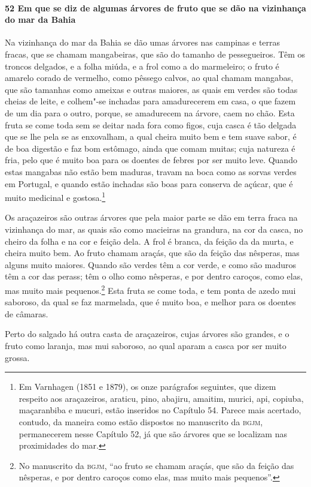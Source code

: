\begin{linenumbers}
\paragraph{52 Em que se diz de algumas árvores de fruto que se dão na vizinhança do mar da
Bahia}\quad
Na vizinhança do mar da Bahia se dão umas árvores nas campinas e terras fracas, que se
chamam mangabeiras, que são do tamanho de pessegueiros. Têm os troncos delgados, e a folha
miúda, e a frol como a do marmeleiro; o fruto é amarelo corado de vermelho, como pêssego
calvos, ao qual chamam mangabas, que são tamanhas como ameixas e outras maiores, as quais
em verdes são todas cheias de leite, e colhem"-se inchadas para amadurecerem em casa, o que
fazem de um dia para o outro, porque, se amadurecem na árvore, caem no chão. Esta fruta se
come toda sem se deitar nada fora como figos, cuja casca é tão delgada que se lhe pela se
as enxovalham, a qual cheira muito bem e tem suave sabor, é de boa digestão e faz bom
estômago, ainda que comam muitas; cuja natureza é fria, pelo que é muito boa para os
doentes de febres por ser muito leve. Quando estas mangabas não estão bem maduras, travam
na boca como as sorvas verdes em Portugal, e quando estão inchadas são boas para conserva
de açúcar, que é muito medicinal e gostosa.\footnote{ Em Varnhagen (1851 e 1879), os onze
parágrafos seguintes, que dizem respeito aos araçazeiros, araticu, pino, abajiru, amaitim,
murici, api, copiuba, maçaranbiba e mucuri, estão inseridos no Capítulo 54. Parece mais
acertado, contudo, da maneira como estão dispostos no manuscrito da \textsc{bgjm},
permanecerem nesse Capítulo 52, já que são árvores que se localizam nas proximidades do
mar.}

Os araçazeiros são outras árvores que pela maior parte se dão em terra fraca na vizinhança
do mar, as quais são como macieiras na grandura, na cor da casca, no cheiro da folha e na
cor e feição dela. A frol é branca, da feição da da murta, e cheira muito bem. Ao fruto
chamam araçás, que são da feição das nêsperas, mas alguns muito maiores. Quando são verdes
têm a cor verde, e como são maduros têm a cor das perass; têm o olho como nêsperas, e por
dentro caroços, como elas, mas muito mais pequenos.\footnote{ No manuscrito da
\textsc{bgjm}, ``ao fruto se chamam araçás, que são da feição das nêsperas, e por dentro
caroços como elas, mas muito mais pequenos''.} Esta fruta se come toda, e tem ponta de
azedo mui saboroso, da qual se faz marmelada, que é muito boa, e melhor para os doentes de
câmaras.


Perto do salgado há outra casta de araçazeiros, cujas árvores são grandes, e o fruto como
laranja, mas mui saboroso, ao qual aparam a casca por ser muito grossa.


\end{linenumbers}
